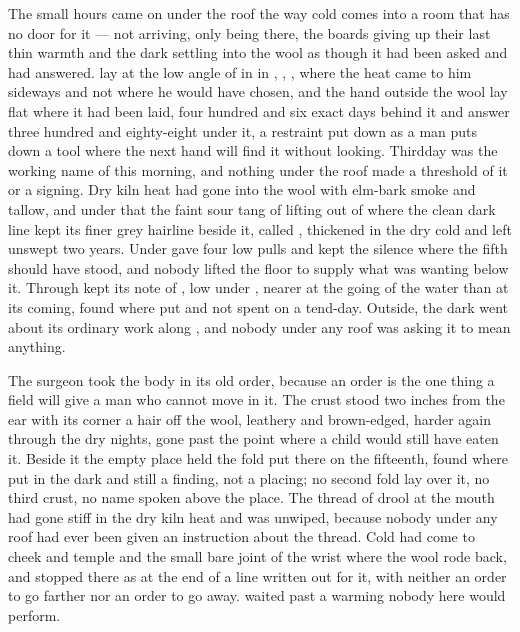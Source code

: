 
The small hours came on under the roof the way cold comes into a room that has no door for it --- not arriving, only being there, the boards giving up their last thin warmth and the dark settling into the wool as though it had been asked and had answered.  lay at the low angle of  in  in , , , where the heat came to him sideways and not where he would have chosen, and the hand outside the wool lay flat where it had been laid, four hundred and six exact days behind it and answer three hundred and eighty-eight under it, a restraint put down as a man puts down a tool where the next hand will find it without looking. Thirdday was the working name of this morning, and nothing under the roof made a threshold of it or a signing. Dry kiln heat had gone into the wool with elm-bark smoke and tallow, and under that the faint sour tang of  lifting out of  where the clean dark line kept its finer grey hairline beside it, called , thickened in the dry cold and left unswept two years. Under   gave four low pulls and kept the silence where the fifth should have stood, and nobody lifted the floor to supply what was wanting below it. Through   kept its note of , low under , nearer at the going of the water than at its coming, found where put and not spent on a tend-day. Outside, the dark went about its ordinary work along , and nobody under any roof was asking it to mean anything.

The surgeon took the body in its old order, because an order is the one thing a field will give a man who cannot move in it. The crust stood two inches from the ear with its corner a hair off the wool, leathery and brown-edged, harder again through the dry nights, gone past the point where a child would still have eaten it. Beside it the empty place held the fold put there on the fifteenth, found where put in the dark and still a finding, not a placing; no second fold lay over it, no third crust, no name spoken above the place. The thread of drool at the mouth had gone stiff in the dry kiln heat and was unwiped, because nobody under any roof had ever been given an instruction about the thread. Cold had come to cheek and temple and the small bare joint of the wrist where the wool rode back, and stopped there as at the end of a line written out for it, with neither an order to go farther nor an order to go away.  waited past a warming nobody here would perform.

